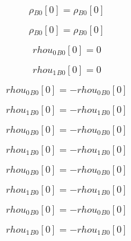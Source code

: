 \documentclass{article}
\begin{document}
\begin{dmath}{\rho{_{B0}}}[{0}] = {\rho{_{B0}}}[{0}]\end{dmath}

\begin{dmath}{\rho{_{B0}}}[{0}] = {\rho{_{B0}}}[{0}]\end{dmath}

\begin{dmath}{rhou_{0}{_{B0}}}[{0}] = 0\end{dmath}

\begin{dmath}{rhou_{1}{_{B0}}}[{0}] = 0\end{dmath}

\begin{dmath}{rhou_{0}{_{B0}}}[{0}] = - {rhou_{0}{_{B0}}}[{0}]\end{dmath}

\begin{dmath}{rhou_{1}{_{B0}}}[{0}] = - {rhou_{1}{_{B0}}}[{0}]\end{dmath}

\begin{dmath}{rhou_{0}{_{B0}}}[{0}] = - {rhou_{0}{_{B0}}}[{0}]\end{dmath}

\begin{dmath}{rhou_{1}{_{B0}}}[{0}] = - {rhou_{1}{_{B0}}}[{0}]\end{dmath}

\begin{dmath}{rhou_{0}{_{B0}}}[{0}] = - {rhou_{0}{_{B0}}}[{0}]\end{dmath}

\begin{dmath}{rhou_{1}{_{B0}}}[{0}] = - {rhou_{1}{_{B0}}}[{0}]\end{dmath}

\begin{dmath}{rhou_{0}{_{B0}}}[{0}] = - {rhou_{0}{_{B0}}}[{0}]\end{dmath}

\begin{dmath}{rhou_{1}{_{B0}}}[{0}] = - {rhou_{1}{_{B0}}}[{0}]\end{dmath}
\end{document}
